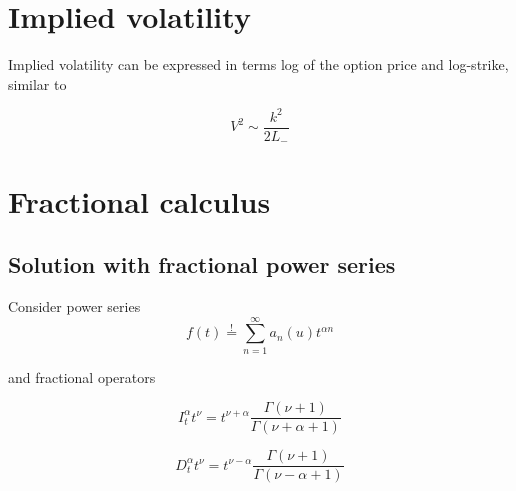 \documentclass[12pt]{article}
\begin{document}
\section{Implied volatility}

Implied volatility can be expressed in terms log of the option price and log-strike, similar to

$$
V ^ { 2 } \sim \frac { k ^ { 2 } } { 2 L _ { - } }
$$

\section{Fractional calculus}

\subsection{Solution with fractional power series}

Consider power series $$
f ( t ) \stackrel { ! } { = } \sum _ { n = 1 } ^ { \infty } a _ { n } ( u ) t ^ { \alpha n }
$$

and fractional operators

$$
I _ { t } ^ { \alpha } t ^ { \nu } = t ^ { \nu + \alpha } \frac { \Gamma ( \nu + 1 ) } { \Gamma ( \nu + \alpha + 1 ) }
$$

$$
D _ { t } ^ { \alpha } t ^ { \nu } = t ^ { \nu - \alpha } \frac { \Gamma ( \nu + 1 ) } { \Gamma ( \nu - \alpha + 1 ) }
$$
\end{document}
